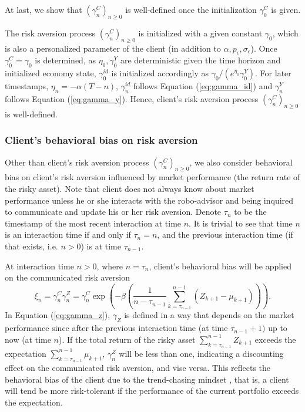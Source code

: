 At last, we show that $(\gamma_n^C)_{n\geq0}$ is well-defined once the initialization $\gamma_0^C$ is given.

The risk aversion process $(\gamma_n^C)_{n\geq0}$ is initialized with a given constant $\gamma_0$, which is also a personalized parameter of the client (in addition to $\alpha,p_\epsilon,\sigma_\epsilon$). Once $\gamma_0^C=\gamma_0$ is determined, as $\eta_0,\gamma_0^Y$ are deterministic given the time horizon and initialized economy state, $\gamma_0^{id}$ is initialized accordingly as $\gamma_0/(e^{\eta_0}\gamma_0^{Y})$. For later timestamps, $\eta_n=-\alpha(T-n)$, $\gamma_n^{id}$ follows Equation (\ref{eq:gamma_id}) and $\gamma_n^Y$ follows Equation (\ref{eq:gamma_y}). Hence, client's risk aversion process $(\gamma_n^C)_{n\geq0}$ is well-defined.

\subsubsection{Client's behavioral bias on risk aversion}

Other than client's risk aversion process $(\gamma_n^C)_{n\geq 0}$, we also consider behavioral bias on client's risk aversion influenced by market performance (the return rate of the risky asset). Note that client does not always know about market performance unless he or she interacts with the robo-advisor and being inquired to communicate and update his or her risk aversion. Denote $\tau_n$ to be the timestamp of the most recent interaction at time $n$. It is trivial to see that time $n$ is an interaction time if and only if $\tau_n=n$, and the previous interaction time (if that exists, i.e. $n>0$) is at time $\tau_{n-1}$.

At interaction time $n>0$, where $n=\tau_n$, client's behavioral bias will be applied on the communicated risk aversion \begin{equation}\label{eq:gamma_z}
    \xi_n=\gamma_n^C\gamma_n^Z=\gamma_n^C\exp{\left(-\beta\left(\frac1{n-\tau_{n-1}}\sum_{k=\tau_{n-1}}^{n-1}(Z_{k+1}-\mu_{k+1})\right)\right)}.
\end{equation}
In Equation (\ref{eq:gamma_z}), $\gamma_Z$ is defined in a way that depends on the market performance since after the previous interaction time (at time $\tau_{n-1}+1)$ up to now (at time $n$). If the total return of the risky asset $\sum_{k=\tau_{n-1}}^{n-1} Z_{k+1}$ exceeds the expectation $\sum_{k=\tau_{n-1}}^{n-1}\mu_{k+1}$, $\gamma_n^Z$ will be less than one, indicating a discounting effect on the communicated risk aversion, and vise versa. This reflects the behavioral bias of the client due to the trend-chasing mindset \cite{oechssler2009cognitive}, that is, a client will tend be more risk-tolerant if the performance of the current portfolio exceeds the expectation.

